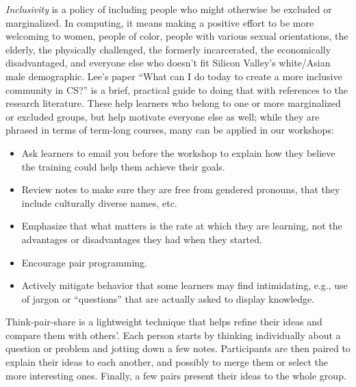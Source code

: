 \emph{Inclusivity} is a policy of including people who might otherwise
be excluded or marginalized. In computing, it means making a positive
effort to be more welcoming to women, people of color, people with
various sexual orientations, the elderly, the physically challenged,
the formerly incarcerated, the economically disadvantaged, and
everyone else who doesn't fit Silicon Valley's white/Asian male
demographic. Lee's paper ``What can I do today to create a more
inclusive community in CS?'' \cite{bib:lee-create-inclusive-community}
is a brief, practical guide to doing that with references to the
research literature. These help learners who belong to one or more
marginalized or excluded groups, but help motivate everyone else as
well; while they are phrased in terms of term-long courses, many can
be applied in our workshops:

\begin{itemize}

\item
  Ask learners to email you before the workshop to explain how they
  believe the training could help them achieve their goals.

\item
  Review notes to make sure they are free from gendered pronouns, that
  they include culturally diverse names, etc.

\item
  Emphasize that what matters is the rate at which they are learning,
  not the advantages or disadvantages they had when they started.

\item
  Encourage pair programming.

\item
  Actively mitigate behavior that some learners may find intimidating,
  e.g., use of jargon or ``questions'' that are actually asked to
  display knowledge.

\end{itemize}



Think-pair-share is a lightweight technique that helps refine their
ideas and compare them with others'.  Each person starts by thinking
individually about a question or problem and jotting down a few notes.
Participants are then paired to explain their ideas to each another,
and possibly to merge them or select the more interesting ones.
Finally, a few pairs present their ideas to the whole group.

